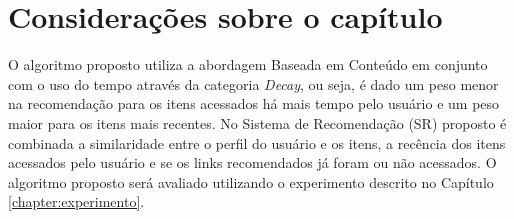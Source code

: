 \section{Considerações sobre o capítulo}

O algoritmo proposto utiliza a abordagem Baseada em Conteúdo em
conjunto com o uso do tempo através da categoria \textit{Decay}, ou seja, é dado um peso menor na recomendação para os
itens acessados há mais tempo pelo usuário e um peso maior para os itens mais recentes. No Sistema de Recomendação (SR)
proposto é combinada a similaridade entre o perfil do usuário e os itens, a recência dos itens acessados pelo usuário e
se os links recomendados já foram ou não acessados. O algoritmo proposto será avaliado utilizando o experimento descrito
no Capítulo \ref{chapter:experimento}.


